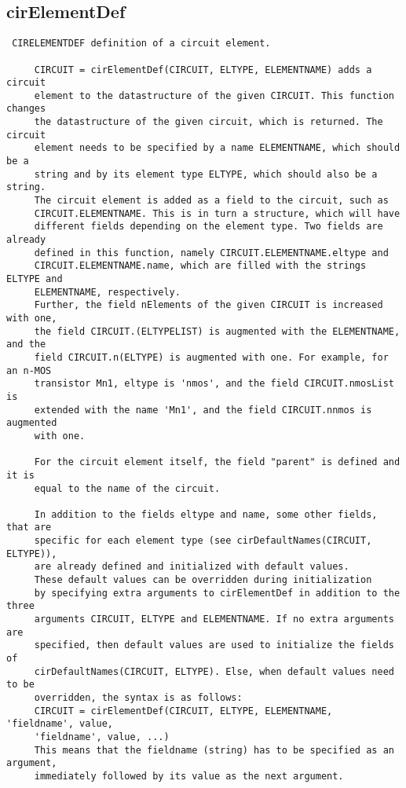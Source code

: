 \newpage
\subsection{cirElementDef}
\label{sec:cirElementDef}
\begin{verbatim}
 CIRELEMENTDEF definition of a circuit element.
 
     CIRCUIT = cirElementDef(CIRCUIT, ELTYPE, ELEMENTNAME) adds a circuit
     element to the datastructure of the given CIRCUIT. This function changes
     the datastructure of the given circuit, which is returned. The circuit
     element needs to be specified by a name ELEMENTNAME, which should be a
     string and by its element type ELTYPE, which should also be a string.
     The circuit element is added as a field to the circuit, such as
     CIRCUIT.ELEMENTNAME. This is in turn a structure, which will have
     different fields depending on the element type. Two fields are already
     defined in this function, namely CIRCUIT.ELEMENTNAME.eltype and
     CIRCUIT.ELEMENTNAME.name, which are filled with the strings ELTYPE and
     ELEMENTNAME, respectively.
     Further, the field nElements of the given CIRCUIT is increased with one,
     the field CIRCUIT.(ELTYPELIST) is augmented with the ELEMENTNAME, and the
     field CIRCUIT.n(ELTYPE) is augmented with one. For example, for an n-MOS
     transistor Mn1, eltype is 'nmos', and the field CIRCUIT.nmosList is
     extended with the name 'Mn1', and the field CIRCUIT.nnmos is augmented
     with one. 
 
     For the circuit element itself, the field "parent" is defined and it is
     equal to the name of the circuit. 
 
     In addition to the fields eltype and name, some other fields, that are 
     specific for each element type (see cirDefaultNames(CIRCUIT, ELTYPE)), 
     are already defined and initialized with default values.
     These default values can be overridden during initialization
     by specifying extra arguments to cirElementDef in addition to the three
     arguments CIRCUIT, ELTYPE and ELEMENTNAME. If no extra arguments are
     specified, then default values are used to initialize the fields of 
     cirDefaultNames(CIRCUIT, ELTYPE). Else, when default values need to be 
     overridden, the syntax is as follows:
     CIRCUIT = cirElementDef(CIRCUIT, ELTYPE, ELEMENTNAME, 'fieldname', value,
     'fieldname', value, ...)
     This means that the fieldname (string) has to be specified as an argument,
     immediately followed by its value as the next argument. 
 

\end{verbatim}
